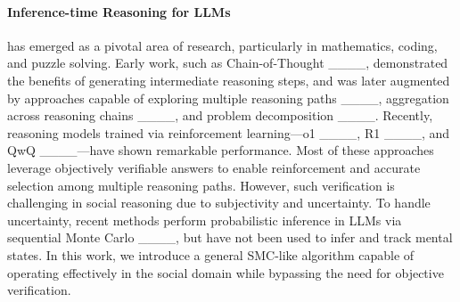 \paragraph{Inference-time Reasoning for LLMs} has emerged as a pivotal area of research, particularly in mathematics, coding, and puzzle solving.
Early work, such as Chain-of-Thought ____, demonstrated the benefits of generating intermediate reasoning steps, and was later augmented by approaches capable of exploring multiple reasoning paths ____, aggregation across reasoning chains ____, and problem decomposition ____.
Recently, reasoning models trained via reinforcement learning---o1 ____, R1 ____, and QwQ ____---have shown remarkable performance.
Most of these approaches leverage objectively verifiable answers to enable reinforcement and accurate selection among multiple reasoning paths.  However, such verification is challenging in social reasoning due to subjectivity and uncertainty. To handle uncertainty, recent methods perform probabilistic inference in LLMs via sequential Monte Carlo ____, but have not been used to infer and track mental states. In this work, we introduce a general SMC-like algorithm capable of operating effectively in the social domain while bypassing the need for objective verification.